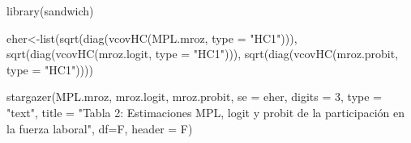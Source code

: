 \documentclass[
  letterpaper,
  DIV=11,
  numbers=noendperiod]{scrreprt}
\newenvironment{Shaded}{\begin{snugshade}}{\end{snugshade}}
\newcommand{\AttributeTok}[1]{\textcolor[rgb]{0.40,0.45,0.13}{#1}}
\newcommand{\DecValTok}[1]{\textcolor[rgb]{0.68,0.00,0.00}{#1}}
\newcommand{\FunctionTok}[1]{\textcolor[rgb]{0.28,0.35,0.67}{#1}}
\newcommand{\NormalTok}[1]{\textcolor[rgb]{0.00,0.23,0.31}{#1}}
\newcommand{\OtherTok}[1]{\textcolor[rgb]{0.00,0.23,0.31}{#1}}
\newcommand{\StringTok}[1]{\textcolor[rgb]{0.13,0.47,0.30}{#1}}
\begin{document}
\begin{Shaded}
\begin{Highlighting}[]
\FunctionTok{library}\NormalTok{(sandwich)}

\NormalTok{eher}\OtherTok{\textless{}{-}}\FunctionTok{list}\NormalTok{(}\FunctionTok{sqrt}\NormalTok{(}\FunctionTok{diag}\NormalTok{(}\FunctionTok{vcovHC}\NormalTok{(MPL.mroz, }\AttributeTok{type =} \StringTok{"HC1"}\NormalTok{))),}
           \FunctionTok{sqrt}\NormalTok{(}\FunctionTok{diag}\NormalTok{(}\FunctionTok{vcovHC}\NormalTok{(mroz.logit, }\AttributeTok{type =} \StringTok{"HC1"}\NormalTok{))),}
           \FunctionTok{sqrt}\NormalTok{(}\FunctionTok{diag}\NormalTok{(}\FunctionTok{vcovHC}\NormalTok{(mroz.probit, }\AttributeTok{type =} \StringTok{"HC1"}\NormalTok{))))}

\FunctionTok{stargazer}\NormalTok{(MPL.mroz, mroz.logit, mroz.probit,}
          \AttributeTok{se =}\NormalTok{ eher,}
          \AttributeTok{digits =} \DecValTok{3}\NormalTok{,}
          \AttributeTok{type =} \StringTok{"text"}\NormalTok{,}
          \AttributeTok{title =} \StringTok{"Tabla 2: Estimaciones MPL, logit y probit de la participación en la fuerza laboral"}\NormalTok{,}
          \AttributeTok{df=}\NormalTok{F,}
          \AttributeTok{header =}\NormalTok{ F)}
\end{Highlighting}
\end{Shaded}
\end{document}
